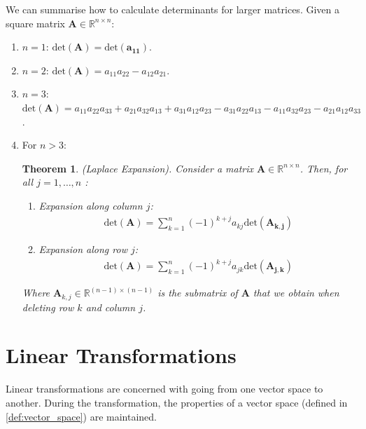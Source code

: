 \documentclass[a4paper,12pt]{article}
\newcommand{\matrx}[1]{\bm{#1}}
\newcommand{\real}{\mathbb{R}}
\newcommand{\dett}[1]{\text{det}(\matrx{#1})}
\newtheorem{theorem}{Theorem}[section]
\begin{document}
	We can summarise how to calculate determinants for larger matrices. Given a square matrix $ \matrx{A} \in \real^{n \times n} $:
	\begin{enumerate}
		\item $ n = 1 $: $ \dett{A} = \dett{a_{11}} $.
		\item $ n = 2 $: $ \dett{A} = a_{11}a_{22} - a_{12}a_{21} $.
		\item $ n = 3 $: $ \dett{A} = a_{11}a_{22}a_{33} + a_{21}a_{32}a_{13} + a_{31}a_{12}a_{23} - a_{31}a_{22}a_{13} - a_{11}a_{32}a_{23} - a_{21}a_{12}a_{33}$.
		\item For $ n > 3 $: \begin{theorem}
			\normalfont (Laplace Expansion). Consider a matrix $ \matrx{A} \in \real^{n \times n} $. Then, for all $ j = 1,\ldots,n $ \cite[page 100]{mml_book}:
			\begin{enumerate}
				\item Expansion along column $ j $:
				\begin{align}
					\dett{A} = \sum_{k = 1}^{n} (-1)^{k + j} a_{kj} \dett{A_{k,j}}
				\end{align}
				\item Expansion along row $ j $:
				\begin{align}
					\dett{A} = \sum_{k = 1}^{n} (-1)^{k + j} a_{jk} \dett{A_{j,k}}
				\end{align}
			\end{enumerate}
			Where $ \matrx{A}_{k,j} \in \real^{(n - 1) \times (n - 1)} $ is the submatrix of $ \matrx{A} $ that we obtain when deleting row $ k $ and column $ j $. 
		\end{theorem}
	\end{enumerate}
	
	\section{Linear Transformations}
	Linear transformations are concerned with going from one vector space to another. During the transformation, the properties of a vector space (defined in \ref{def:vector_space}) are maintained. 
	
\end{document}
